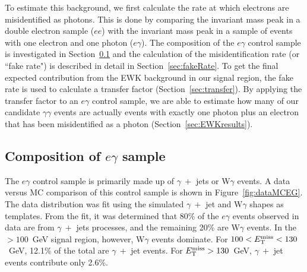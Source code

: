 To estimate this background, we first calculate the rate at which electrons are misidentified as photons. This is done by comparing the invariant mass peak in a double electron sample ($ee$) with the invariant mass peak in a sample of events with one electron and one photon ($e\gamma$). The composition of the $e\gamma$ control sample is investigated in Section~\ref{sec:EWKMC} and the calculation of the misidentification rate (or ``fake rate") is described in detail in Section~\ref{sec:fakeRate}. To get the final expected contribution from the EWK background in our signal region, the fake rate is used to calculate a transfer factor (Section~\ref{sec:transfer}). By applying the transfer factor to an $e\gamma$ control sample, we are able to estimate how many of our candidate $\gamma\gamma$ events are actually events with exactly one photon plus an electron that has been misidentified as a photon (Section~\ref{sec:EWKresults}). 


\subsection{Composition of $e\gamma$ sample}
\label{sec:EWKMC}
The $e\gamma$ control sample is primarily made up of $\gamma~+$ jets or W$\gamma$ events. A data versus MC comparison of this control sample is shown in Figure~\ref{fig:dataMCEG}. The data distribution was fit using the simulated $\gamma~+$ jet and W$\gamma$ shapes as templates. From the fit, it was determined that 80\% of the $e\gamma$ events observed in data are from $\gamma~+$ jets  processes, and the remaining 20\% are W$\gamma$ events.  
In the \ETmiss$>100$~GeV signal region, however, W$\gamma$ events dominate.
For $100 < E_{\mathrm{T}}^{\text{miss}} < 130$~GeV, 12.1\% of the total are
$\gamma~+$ jet events. For $E_{\mathrm{T}}^{\text{miss}} >130$~GeV, 
$\gamma~+$ jet events contribute only 2.6\%.


